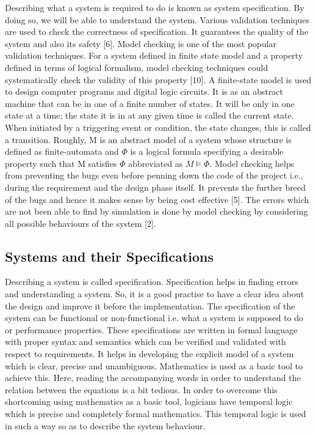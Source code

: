 \documentclass{article}
\begin{document}
Describing what a system is required to do is known as system specification. By doing so, we will be able to understand the system. Various validation techniques are used to check the correctness of specification. It guarantees the quality of the system and also its safety [6]. Model checking is one of the most popular validation techniques. For a system defined in finite state model and a property defined in terms of logical formalism, model checking techniques could systematically check the validity of this property [10]. A finite-state model is used to design computer programs and digital logic circuits. It is as an abstract machine that can be in one of a finite number of states. It will be only in one state at a time; the state it is in at any given time is called the current state. When initiated by a triggering event or condition, the state changes, this is called a transition.
Roughly, M is an abstract model of a system whose structure is defined as finite-automata and $\Phi$ is a logical formula specifying a desirable property such that M satisfies $\Phi$ abbreviated as $M \models \Phi$.
Model checking helps from preventing the bugs even before penning down the code of the project i.e., during the requirement and the design phase itself. It prevents the further breed of the bugs and hence it makes sense by being cost effective [5]. The errors which are not been able to find by simulation is done by model checking by considering all possible behaviours of the system [2].


\subsection{Systems and their Specifications}
\label{sec:SystemsSpec}

Describing a system is called specification. Specification helps in finding errors and    understanding a system. So, it is a good practise to have a clear idea about the design and improve it before the implementation. The specification of the system can be functional or non-functional i.e. what a system is supposed to do or performance properties. These specifications are written in formal language with proper syntax and semantics which can be verified and validated with respect to requirements.
It helps in developing the explicit model of a system which is clear, precise and unambiguous. Mathematics is used as a basic tool to achieve this. Here, reading the accompanying words in order to understand the relation between the equations is a bit tedious. In order to overcome this shortcoming using mathematics as a basic tool, logicians have temporal logic which is precise and completely formal mathematics. This temporal logic is used in such a way so as to describe the system behaviour.
\end{document}
